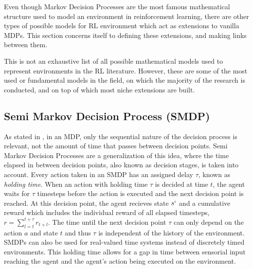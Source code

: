 \documentclass{../main.tex}{subfile}
\begin{document}
Even though Markov Decision Processes are the most famous mathematical structure used to model an environment in reinforcement learning, there are other types of possible models for RL environment which act as extensions to vanilla MDPs. This section concerns itself to defining these extensions, and making links between them. 


This is not an exhaustive list of all possible mathematical models used to represent environments in the RL literature. However, these are some of the most used or fundamental models in the field, on which the majority of the research is conducted, and on top of which most niche extensions are built.

\subsection{Semi Markov Decision Process (SMDP)}

As stated in \citep{Barto2003}, in an MDP, only the sequential nature of the decision process is relevant, not the amount of time that passes between decision points. Semi Markov Decision Processes are a generalization of this idea, where the time elapsed in between decision points, also known as decision stages, is taken into account. Every action taken in an SMDP has an assigned delay $\tau$, known as \textit{holding time}. When an action with holding time $\tau$ is decided at time $t$, the agent waits for $\tau$ timesteps before the action is executed and the next decision point is reached. At this decision point, the agent recieves state $s`$ and a cumulative reward which includes the individual reward of all elapsed timesteps, $r = \sum_{l=t}^{t+\tau}r_{t+l}$. The time until the next decision point $\tau$ can only depend on the action $a$ and state $t$ and thus $\tau$ is independent of the history of the environment. SMDPs can also be used for real-valued time systems instead of discretely timed environments. This holding time allows for a gap in time between sensorial input reaching the agent and the agent's action being executed on the environment. %
\end{document}
